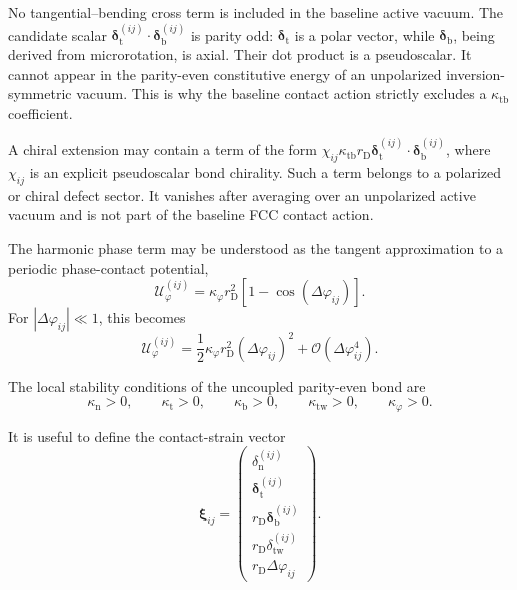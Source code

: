 No tangential--bending cross term is included in the baseline active vacuum. The candidate scalar $\boldsymbol{\delta}_{\mathrm{t}}^{(ij)} \cdot \boldsymbol{\delta}_{\mathrm{b}}^{(ij)}$ is parity odd: $\boldsymbol{\delta}_{\mathrm{t}}$ is a polar vector, while $\boldsymbol{\delta}_{\mathrm{b}}$, being derived from microrotation, is axial. Their dot product is a pseudoscalar. It cannot appear in the parity-even constitutive energy of an unpolarized inversion-symmetric vacuum. This is why the baseline contact action strictly excludes a $\kappa_{\mathrm{tb}}$ coefficient.

A chiral extension may contain a term of the form $\chi_{ij} \kappa_{\mathrm{tb}} r_{\mathrm{D}} \boldsymbol{\delta}_{\mathrm{t}}^{(ij)} \cdot \boldsymbol{\delta}_{\mathrm{b}}^{(ij)}$, where $\chi_{ij}$ is an explicit pseudoscalar bond chirality. Such a term belongs to a polarized or chiral defect sector. It vanishes after averaging over an unpolarized active vacuum and is not part of the baseline FCC contact action.

The harmonic phase term may be understood as the tangent approximation to a periodic phase-contact potential,
\begin{equation}
    \mathcal{U}_{\varphi}^{(ij)} = \kappa_\varphi r_{\mathrm{D}}^2 \left[ 1-\cos(\Delta\varphi_{ij}) \right].
\end{equation}
For $|\Delta\varphi_{ij}| \ll 1$, this becomes
\begin{equation}
    \mathcal{U}_{\varphi}^{(ij)} = \frac{1}{2} \kappa_\varphi r_{\mathrm{D}}^2 (\Delta\varphi_{ij})^2 + \mathcal{O}(\Delta\varphi_{ij}^4).
\end{equation}

The local stability conditions of the uncoupled parity-even bond are
\begin{equation}
    \kappa_{\mathrm{n}}>0, \qquad \kappa_{\mathrm{t}}>0, \qquad \kappa_{\mathrm{b}}>0, \qquad \kappa_{\mathrm{tw}}>0, \qquad \kappa_\varphi>0.
\end{equation}

It is useful to define the contact-strain vector
\begin{equation}
    \boldsymbol{\xi}_{ij} =
    \begin{pmatrix}
        \delta_{\mathrm{n}}^{(ij)} \\
        \boldsymbol{\delta}_{\mathrm{t}}^{(ij)} \\
        r_{\mathrm{D}}\boldsymbol{\delta}_{\mathrm{b}}^{(ij)} \\
        r_{\mathrm{D}}\delta_{\mathrm{tw}}^{(ij)} \\
        r_{\mathrm{D}}\Delta\varphi_{ij}
    \end{pmatrix}.
\end{equation}

